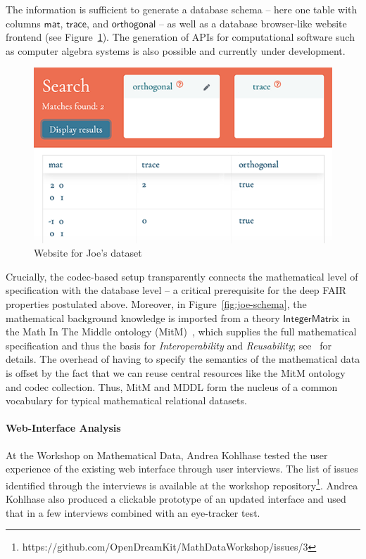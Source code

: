 The information is sufficient to generate a database schema -- here one table with columns $\mathsf{mat}$, $\mathsf{trace}$, and $\mathsf{orthogonal}$ -- as well as a database browser-like website frontend (see Figure~\ref{fig:joe}).
The generation of APIs for computational software such as computer algebra systems is also possible and currently under development. 

\begin{figure}[ht]
  \includegraphics{data_joe.png}
  \caption{Website for Joe's dataset}\label{fig:joe}
\end{figure}

Crucially,  the codec-based setup transparently connects the mathematical level of specification with the database level -- a critical prerequisite for the deep FAIR properties postulated above.
Moreover, in Figure~\ref{fig:joe-schema}, the mathematical background knowledge is imported from a theory $\mathsf{IntegerMatrix}$ in the Math In The Middle ontology (MitM)~\cite{MitM:on}, which supplies the full mathematical specification and thus the basis for \emph{Interoperability} and \emph{Reusability}; see~\cite{BerKohRab:tumdi19,WieKohRab:vtuimkb17,KohMuePfe:kbimss17} for details.
The overhead of having to specify the semantics of the mathematical data is offset by the fact that we can reuse central resources like the MitM ontology and codec collection. 
Thus, MitM and MDDL form the nucleus of a common vocabulary for typical mathematical relational datasets. 

\paragraph{Web-Interface Analysis}
At the Workshop on Mathematical Data,
Andrea Kohlhase tested the user experience of the existing web interface
through user interviews.
The list of issues identified through the interviews is available at the 
workshop repository\footnote{https://github.com/OpenDreamKit/MathDataWorkshop/issues/3}.
Andrea Kohlhase also produced a clickable prototype of an updated interface
and used that in a few interviews combined with an eye-tracker test.




